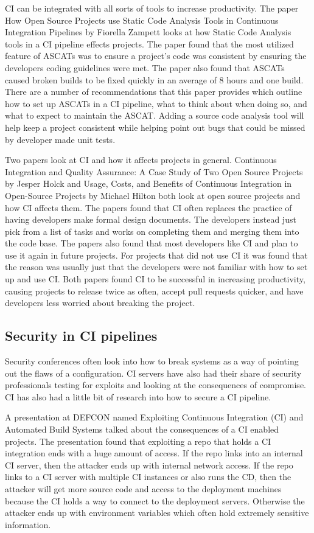 	CI can be integrated with all sorts of tools to increase productivity. The paper How Open Source Projects use Static Code Analysis Tools in Continuous Integration Pipelines by Fiorella Zampett looks at how Static Code Analysis tools in a CI pipeline effects projects.\cite{Zampetti} The paper found that the most utilized feature of ASCATs was to ensure a project's code was consistent by ensuring the developers coding guidelines were met. The paper also found that ASCATs caused broken builds to be fixed quickly in an average of 8 hours and one build. There are a number of recommendations that this paper provides which outline how to set up ASCATs in a CI pipeline, what to think about when doing so, and what to expect to maintain the ASCAT. Adding a source code analysis tool will help keep a project consistent while helping point out bugs that could be missed by developer made unit tests.

	Two papers look at CI and how it affects projects in general. Continuous Integration and Quality Assurance: A Case Study of Two Open Source Projects by Jesper Holck and Usage, Costs, and Benefits of Continuous Integration in Open-Source Projects by Michael Hilton both look at open source projects and how CI affects them.\cite{Hilton}\cite{Holck} The papers found that CI often replaces the practice of having developers make formal design documents. The developers instead just pick from a list of tasks and works on completing them and merging them into the code base. The papers also found that most developers like CI and plan to use it again in future projects. For projects that did not use CI it was found that the reason was usually just that the developers were not familiar with how to set up and use CI. Both papers found CI to be successful in increasing productivity, causing projects to release twice as often, accept pull requests quicker, and have developers less worried about breaking the project. 

\subsection{Security in CI pipelines}
	Security conferences often look into how to break systems as a way of pointing out the flaws of a configuration. CI servers have also had their share of security professionals testing for exploits and looking at the consequences of compromise. CI has also had a little bit of research into how to secure a CI pipeline.

	A presentation at DEFCON named Exploiting Continuous Integration (CI) and Automated Build Systems talked about the consequences of a CI enabled projects\cite{spaceb0x}. The presentation found that exploiting a repo that holds a CI integration ends with a huge amount of access. If the repo links into an internal CI server, then the attacker ends up with internal network access. If the repo links to a CI server with multiple CI instances or also runs the CD, then the attacker will get more source code and access to the deployment machines because the CI holds a way to connect to the deployment servers. Otherwise the attacker ends up with environment variables which often hold extremely sensitive information.

